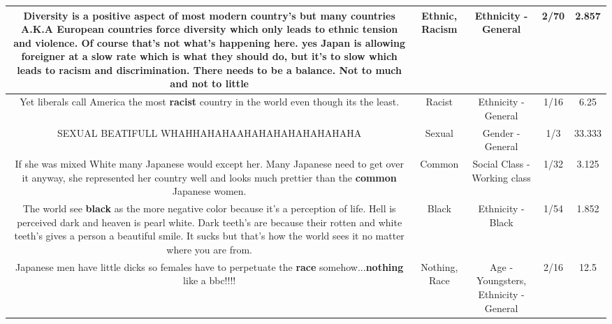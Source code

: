 \documentclass[11pt]{article}
\newlength\mylength
\begin{document}
\begin{center}
\begin{longtable}{|C{.65\mylength}|C{.30\mylength}|C{.12\mylength}|C{.12\mylength}|C{.12\mylength}|}
  \small Diversity is a positive aspect of most modern country's but many countries A.K.A European countries force diversity which only leads to \textbf{ethnic} tension and violence. Of course that's not what's happening here. yes Japan is allowing foreigner at a slow rate which is what they should do, but it's to slow which leads to \textbf{racism} and discrimination. There needs to be a balance. Not to much and not to little\normalsize   & Ethnic, Racism & Ethnicity - General & 2/70 & 2.857 \\  \hline
  \small Yet liberals call America the most \textbf{racist} country in the world even though its the least.\normalsize   & Racist & Ethnicity - General & 1/16 & 6.25 \\  \hline
  \small SEXUAL BEATIFULL WHAHHAHAHAAHAHAHAHAHAHAHAHA\normalsize   & Sexual & Gender - General & 1/3 & 33.333 \\  \hline
  \small If she was mixed White many Japanese would except her. Many Japanese need to get over it anyway, she represented her country well and looks much prettier than the \textbf{common} Japanese women.\normalsize   & Common & Social Class - Working class & 1/32 & 3.125 \\  \hline
  \small The world see \textbf{black} as the more negative color because it's a perception of life. Hell is perceived dark and heaven is pearl white. Dark teeth's are because their rotten and white teeth's gives a person a beautiful smile. It sucks but that's how the world sees it no matter where you are from.\normalsize   & Black & Ethnicity - Black & 1/54 & 1.852 \\  \hline
  \small Japanese men have little dicks so females have to perpetuate the \textbf{race} somehow...\textbf{nothing} like a bbc!!!!\normalsize   & Nothing, Race & Age - Youngsters, Ethnicity - General & 2/16 & 12.5 \\  \hline

\end{longtable}
\end{center}
\end{document}
